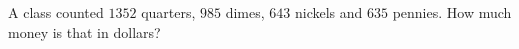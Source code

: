 A class counted $1352$ quarters, $985$ dimes, $643$ nickels and $635$ pennies. How much money is that in dollars?
